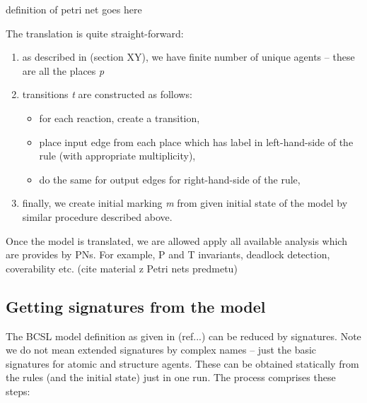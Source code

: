\documentclass[12pt]{fithesis2}
\begin{document}
definition of petri net goes here

The translation is quite straight-forward: 

\begin{enumerate}
\item as described in (section XY), we have finite number of unique agents -- these are all the places \emph{p}
\item transitions \emph{t} are constructed as follows:
\begin{itemize}
  \item for each reaction, create a transition,
  \item place input edge from each place which has label in left-hand-side of the rule (with appropriate multiplicity),
  \item do the same for output edges for right-hand-side of the rule,
\end{itemize}
\item finally, we create initial marking \emph{m} from given initial state of the model by similar procedure described above.
\end{enumerate}

Once the model is translated, we are allowed apply all available analysis which are provides by PNs. For example, P and T invariants, deadlock detection, coverability etc. (cite material z Petri nets predmetu)

\subsection{Getting signatures from the model}

The BCSL model definition as given in (ref...) can be reduced by signatures. Note we do not mean extended signatures by complex names -- just the basic signatures for atomic and structure agents. These can be obtained statically from the rules (and the initial state) just in one run. The process comprises these steps:
\end{document}
